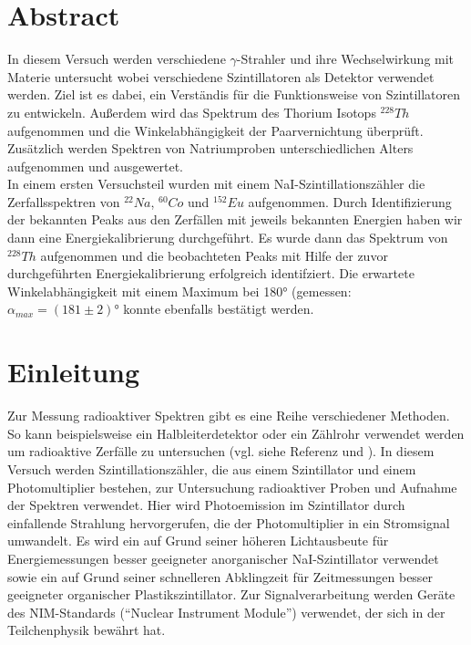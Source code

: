 \documentclass[12pt,listof=totoc]{scrartcl}
\title{\vspace{0cm}{\Huge Fortgeschrittenen-Praktikum I:\\ \vspace{1cm} Szintillationszähler}}
\author{Saskia Bondza\\Simon Stephan}
\date{durchgeführt am 12.10.2016 und 13.10.2016}
\begin{document}
\maketitle
\newpage

\section*{Abstract}

In diesem Versuch werden verschiedene $\gamma$-Strahler und ihre Wechselwirkung mit Materie untersucht wobei verschiedene Szintillatoren als Detektor verwendet werden. Ziel ist es dabei, ein Verständis für die Funktionsweise von Szintillatoren zu entwickeln. Außerdem wird das Spektrum des Thorium Isotops $^{228}Th$ aufgenommen  und die Winkelabhängigkeit der Paarvernichtung überprüft. Zusätzlich werden Spektren von Natriumproben unterschiedlichen Alters aufgenommen und ausgewertet.\\

In einem ersten Versuchsteil wurden mit einem NaI-Szintillationszähler die Zerfallsspektren von  $^{22}Na$, $^{60}Co$ und $^{152}Eu$ aufgenommen. Durch Identifizierung der bekannten Peaks aus den Zerfällen mit jeweils bekannten Energien haben wir dann eine Energiekalibrierung durchgeführt. Es wurde dann das Spektrum von $^{228}Th$ aufgenommen und die beobachteten Peaks mit Hilfe der zuvor durchgeführten Energiekalibrierung erfolgreich identifziert. 
Die erwartete Winkelabhängigkeit mit einem Maximum bei 180° (gemessen: $\alpha_{max} = (181\pm 2)°$ konnte ebenfalls bestätigt werden.


\newpage

\thispagestyle{empty}
\tableofcontents
\newpage

\section{Einleitung}


Zur Messung radioaktiver Spektren gibt es eine Reihe verschiedener Methoden. So kann beispielsweise ein Halbleiterdetektor oder ein Zählrohr verwendet werden um radioaktive Zerfälle zu untersuchen (vgl. siehe Referenz \cite{staat} und \cite{staat}). In diesem Versuch werden Szintillationszähler, die aus einem Szintillator und einem Photomultiplier bestehen, zur Untersuchung radioaktiver Proben und Aufnahme der Spektren verwendet. Hier wird Photoemission im Szintillator durch einfallende Strahlung hervorgerufen, die der Photomultiplier in ein Stromsignal umwandelt.
Es wird ein auf Grund seiner höheren Lichtausbeute für Energiemessungen besser geeigneter anorganischer NaI-Szintillator verwendet sowie ein auf Grund seiner schnelleren Abklingzeit für Zeitmessungen besser geeigneter organischer Plastikszintillator.
Zur Signalverarbeitung werden Geräte des NIM-Standards ("`Nuclear Instrument Module"') verwendet, der sich in der Teilchenphysik bewährt hat.\\
\end{document}
